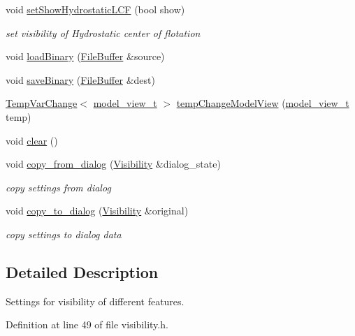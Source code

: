 \begin{DoxyCompactItemize}
void \hyperlink{classShipCAD_1_1Visibility_af7443d243fd0415c749e5816d6158727}{set\+Show\+Hydrostatic\+L\+CF} (bool show)
\begin{DoxyCompactList}\small\item\em set visibility of Hydrostatic center of flotation \end{DoxyCompactList}\item 
void \hyperlink{classShipCAD_1_1Visibility_a418d8fcee4c8f7c0c5c0691249ded677}{load\+Binary} (\hyperlink{classShipCAD_1_1FileBuffer}{File\+Buffer} \&source)
\item 
void \hyperlink{classShipCAD_1_1Visibility_adaf76df822f6f03a93a1b827c81fe58f}{save\+Binary} (\hyperlink{classShipCAD_1_1FileBuffer}{File\+Buffer} \&dest)
\item 
\hyperlink{classShipCAD_1_1TempVarChange}{Temp\+Var\+Change}$<$ \hyperlink{namespaceShipCAD_a742f9cd95e62e207769e17467ecd5bb7}{model\+\_\+view\+\_\+t} $>$ \hyperlink{classShipCAD_1_1Visibility_a5c794da01fd292a34ceec882678aea63}{temp\+Change\+Model\+View} (\hyperlink{namespaceShipCAD_a742f9cd95e62e207769e17467ecd5bb7}{model\+\_\+view\+\_\+t} temp)
\item 
void \hyperlink{classShipCAD_1_1Visibility_af3e925196f71caa8e8ddabd2e7210bbf}{clear} ()
\item 
void \hyperlink{classShipCAD_1_1Visibility_ab8ebd7e609781f3ded96e355b7e2b869}{copy\+\_\+from\+\_\+dialog} (\hyperlink{classShipCAD_1_1Visibility}{Visibility} \&dialog\+\_\+state)
\begin{DoxyCompactList}\small\item\em copy settings from dialog \end{DoxyCompactList}\item 
void \hyperlink{classShipCAD_1_1Visibility_a878236b2beab6140d3d9b880868eb5b7}{copy\+\_\+to\+\_\+dialog} (\hyperlink{classShipCAD_1_1Visibility}{Visibility} \&original)
\begin{DoxyCompactList}\small\item\em copy settings to dialog data \end{DoxyCompactList}\end{DoxyCompactItemize}


\subsection{Detailed Description}
Settings for visibility of different features. 

Definition at line 49 of file visibility.\+h.



